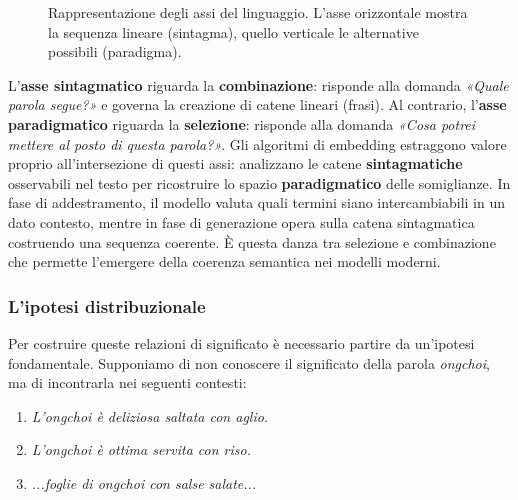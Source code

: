 \begin{figure}[htbp]
    \caption{Rappresentazione degli assi del linguaggio. L'asse orizzontale mostra la sequenza lineare (sintagma), quello verticale le alternative possibili (paradigma).}
    \label{fig:linguistic_axes_final}
\end{figure}
L'\textbf{asse sintagmatico} riguarda la \textbf{combinazione}: risponde alla domanda \textit{«Quale parola segue?»} e governa la creazione di catene lineari (frasi). Al contrario, l'\textbf{asse paradigmatico} riguarda la \textbf{selezione}: risponde alla domanda \textit{«Cosa potrei mettere al posto di questa parola?»}. 
Gli algoritmi di embedding estraggono valore proprio all'intersezione di questi assi: analizzano le catene \textbf{sintagmatiche} osservabili nel testo per ricostruire lo spazio \textbf{paradigmatico} delle somiglianze. In fase di addestramento, il modello valuta quali termini siano intercambiabili in un dato contesto, mentre in fase di generazione opera sulla catena sintagmatica costruendo una sequenza coerente. È questa danza tra selezione e combinazione che permette l'emergere della coerenza semantica nei modelli moderni.

\subsubsection{L'ipotesi distribuzionale}
\label{subsubsec:distributional_hypothesis}

Per costruire queste relazioni di significato è necessario partire da un'ipotesi fondamentale. Supponiamo di non conoscere il significato della parola \textit{ongchoi}, ma di incontrarla nei seguenti contesti:

\begin{enumerate}
    \item \textit{L'ongchoi è deliziosa saltata con aglio.}
    \item \textit{L'ongchoi è ottima servita con riso.}
    \item \textit{...foglie di ongchoi con salse salate...}
\end{enumerate}

